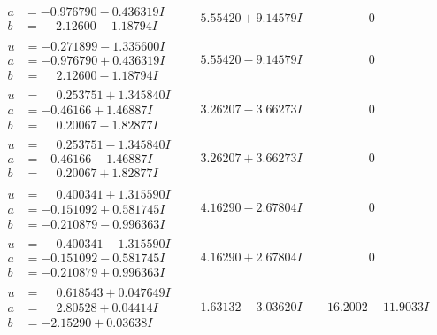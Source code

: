 \documentclass[1p]{elsarticle_modified}
\theoremstyle{definition}
\begin{document}
$$\begin{array}{c|c|c}
\begin{aligned}
a &= -0.976790 - 0.436319 I \\
b &= \phantom{-}2.12600 + 1.18794 I\end{aligned}
 & \phantom{-}5.55420 + 9.14579 I & \phantom{-0.000000 } 0 \\ \hline\begin{aligned}
u &= -0.271899 - 1.335600 I \\
a &= -0.976790 + 0.436319 I \\
b &= \phantom{-}2.12600 - 1.18794 I\end{aligned}
 & \phantom{-}5.55420 - 9.14579 I & \phantom{-0.000000 } 0 \\ \hline\begin{aligned}
u &= \phantom{-}0.253751 + 1.345840 I \\
a &= -0.46166 + 1.46887 I \\
b &= \phantom{-}0.20067 - 1.82877 I\end{aligned}
 & \phantom{-}3.26207 - 3.66273 I & \phantom{-0.000000 } 0 \\ \hline\begin{aligned}
u &= \phantom{-}0.253751 - 1.345840 I \\
a &= -0.46166 - 1.46887 I \\
b &= \phantom{-}0.20067 + 1.82877 I\end{aligned}
 & \phantom{-}3.26207 + 3.66273 I & \phantom{-0.000000 } 0 \\ \hline\begin{aligned}
u &= \phantom{-}0.400341 + 1.315590 I \\
a &= -0.151092 + 0.581745 I \\
b &= -0.210879 - 0.996363 I\end{aligned}
 & \phantom{-}4.16290 - 2.67804 I & \phantom{-0.000000 } 0 \\ \hline\begin{aligned}
u &= \phantom{-}0.400341 - 1.315590 I \\
a &= -0.151092 - 0.581745 I \\
b &= -0.210879 + 0.996363 I\end{aligned}
 & \phantom{-}4.16290 + 2.67804 I & \phantom{-0.000000 } 0 \\ \hline\begin{aligned}
u &= \phantom{-}0.618543 + 0.047649 I \\
a &= \phantom{-}2.80528 + 0.04414 I \\
b &= -2.15290 + 0.03638 I\end{aligned}
 & \phantom{-}1.63132 - 3.03620 I & \phantom{-}16.2002 - 11.9033 I \\ \hline\begin{aligned}

\end{aligned}
\end{array}$$
\end{document}

